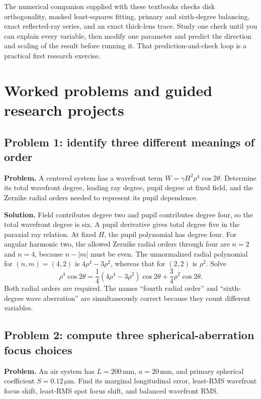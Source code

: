 The numerical companion supplied with these textbooks checks disk
orthogonality, masked least-squares fitting, primary and sixth-degree
balancing, exact reflected-ray series, and an exact thick-lens trace. Study
one check until you can explain every variable, then modify one parameter
and predict the direction and scaling of the result before running it. That
prediction-and-check loop is a practical first research exercise.

\chapter{Worked problems and guided research projects}
\label{ab:problems}

\section{Problem 1: identify three different meanings of order}
\textbf{Problem.} A centered system has a wavefront term
$W=\gamma H^2\rho^4\cos2\theta$. Determine its total wavefront degree,
leading ray degree, pupil degree at fixed field, and the Zernike radial
orders needed to represent its pupil dependence.

\textbf{Solution.} Field contributes degree two and pupil contributes degree
four, so the total wavefront degree is six. A pupil derivative gives total
degree five in the paraxial ray relation. At fixed $H$, the pupil polynomial
has degree four. For angular harmonic two, the allowed Zernike radial
orders through four are $n=2$ and $n=4$, because $n-|m|$ must be even.
The unnormalized radial polynomial for $(n,m)=(4,2)$ is
$4\rho^4-3\rho^2$, whereas that for $(2,2)$ is $\rho^2$.
Solve
\begin{equation}
 \rho^4\cos2\theta
   =\frac14(4\rho^4-3\rho^2)\cos2\theta
       +\frac34\rho^2\cos2\theta.
\end{equation}
Both radial orders are required. The names ``fourth radial order'' and
``sixth-degree wave aberration'' are simultaneously correct because they
count different variables.

\section{Problem 2: compute three spherical-aberration focus choices}
\textbf{Problem.} An air system has $L=200\,\mathrm{mm}$,
$a=20\,\mathrm{mm}$, and primary spherical coefficient
$S=0.12\,\mathrm{\mu m}$. Find its marginal longitudinal error, least-RMS
wavefront focus shift, least-RMS spot focus shift, and balanced wavefront RMS.

